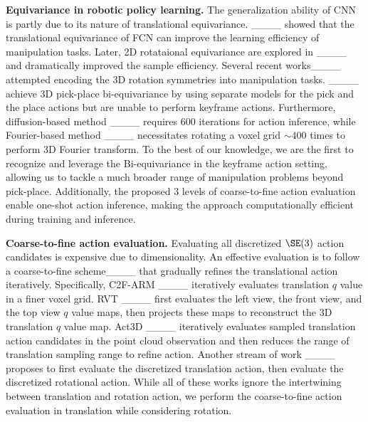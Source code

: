 \textbf{Equivariance in robotic policy learning.}
The generalization ability of CNN is partly due to its nature of translational equivariance. ____ showed that the translational equivariance of FCN can improve the learning efficiency of manipulation tasks.
Later, 2D rotataional equivariance are explored in ____ and dramatically improved the sample efficiency. Several recent works____ attempted encoding the 3D rotation symmetries into manipulation tasks. 
____ achieve 3D pick-place bi-equivariance by using separate models for the pick and the place actions but are unable to perform keyframe actions. Furthermore, diffusion-based method ____ requires $600$ iterations for action inference, while Fourier-based method ____ necessitates rotating a voxel grid $\sim 400$ times to perform 3D Fourier transform.
To the best of our knowledge, we are the first to recognize and leverage the Bi-equivariance in the keyframe action setting, allowing us to tackle a much broader range of manipulation problems beyond pick-place. Additionally, the proposed 3 levels of coarse-to-fine action evaluation enable one-shot action inference, making the approach computationally efficient during training and inference.

\textbf{Coarse-to-fine action evaluation.}
Evaluating all discretized $\SE(3)$ action candidates is expensive due to dimensionality. An effective evaluation is to follow a coarse-to-fine scheme____ that gradually refines the translational action iteratively. Specifically, C2F-ARM ____ iteratively evaluates translation $q$ value in a finer voxel grid. RVT ____ first evaluates the left view, the front view, and the top view $q$ value maps, then projects these maps to reconstruct the 3D translation $q$ value map. Act3D ____ iteratively evaluates sampled translation action candidates in the point cloud observation and then reduces the range of translation sampling range to refine action. Another stream of work ____ proposes to first evaluate the discretized translation action, then evaluate the discretized rotational action. While all of these works ignore the intertwining between translation and rotation action, we perform the coarse-to-fine action evaluation in translation while considering rotation.